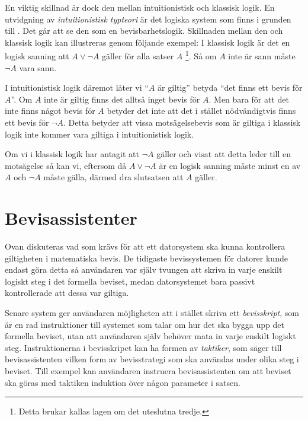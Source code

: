 En viktig skillnad är dock den mellan intuitionistisk och klassisk logik. En
utvidgning av \emph{intuitionistisk typteori}\cite{martin1984intuitionistic} är
det logiska system som finns i grunden till \coq{}\cite{bertot2004interactive}.
Det går att se den som en bevisbarhetslogik. Skillnaden mellan den och klassisk
logik kan illustreras genom följande exempel: I klassisk logik är det en logisk
sanning att $A \lor \neg A$ gäller för alla satser $A$ \footnote{Detta brukar
kallas lagen om det uteslutna tredje.}. Så om $A$ inte är sann måste $\neg A$
vara sann\cite{bennet2004forsta}.

I intuitionistisk logik däremot låter vi ``$A$ är giltig'' betyda ``det finns
ett bevis för $A$''. Om $A$ inte är giltig finns det alltså inget bevis för
$A$. Men bara för att det inte finns något bevis för $A$ betyder det inte att
det i stället nödvändigtvis finns ett bevis för $\neg A$. Detta betyder att
vissa motsägelsebevis som är giltiga i klassisk logik inte kommer vara giltiga
i intuitionistisk logik\cite{barendregt2001proofdependent}.

Om vi i klassisk logik har antagit att $\neg A$ gäller och visat att detta
leder till en motsägelse så kan vi, eftersom då $A \lor \neg A$ är en logisk
sanning måste minst en av $A$ och $\neg A$ måste gälla, därmed dra slutsatsen
att $A$ gäller.

\section{Bevisassistenter}
Ovan diskuteras vad som krävs för att ett datorsystem ska kunna kontrollera
giltigheten i matematiska bevis. De tidigaste bevissystemen för datorer kunde
endast göra detta så användaren var själv tvungen att skriva in varje enskilt
logiskt steg i det formella beviset, medan datorsystemet bara passivt
kontrollerade att dessa var giltiga.

Senare system ger användaren möjligheten att i stället skriva ett
\emph{bevisskript}, som är en rad instruktioner till systemet som talar om hur
det ska bygga upp det formella beviset, utan att användaren själv behöver mata
in varje enskilt logiskt steg.
Instruktionerna i bevisskripet kan ha formen av \emph{taktiker}, som säger till
bevisassistenten vilken form av bevisstrategi som ska användas under olika steg
i beviset. Till exempel kan användaren instruera bevisassistenten om att
beviset ska göras med taktiken induktion över någon parameter i satsen.

